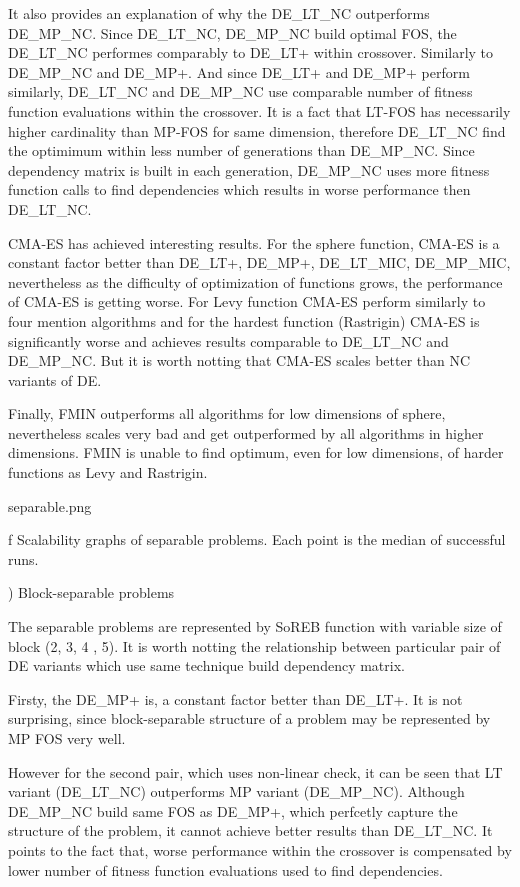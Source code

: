 It also provides an explanation of why the DE\_LT\_NC outperforms DE\_MP\_NC. Since
DE\_LT\_NC, DE\_MP\_NC build optimal FOS, the DE\_LT\_NC performes comparably to DE\_LT+
within crossover. Similarly to DE\_MP\_NC and DE\_MP+. And since DE\_LT+ and DE\_MP+
perform similarly, DE\_LT\_NC and DE\_MP\_NC use comparable number of fitness function
evaluations within the crossover. It is a fact that LT-FOS has necessarily higher
cardinality than MP-FOS for same dimension, therefore DE\_LT\_NC find the optimimum
within less number of generations than DE\_MP\_NC. Since dependency matrix is built
in each generation, DE\_MP\_NC uses more fitness function calls to find dependencies
which results in worse performance then DE\_LT\_NC.

CMA-ES has achieved interesting results. For the sphere function, CMA-ES is a constant factor
better than DE\_LT+, DE\_MP+, DE\_LT\_MIC, DE\_MP\_MIC, nevertheless as the difficulty of
optimization of functions grows, the performance of CMA-ES is getting worse. For Levy function
CMA-ES perform similarly to four mention algorithms and for the hardest function (Rastrigin)
CMA-ES is significantly worse and achieves results comparable to DE\_LT\_NC and DE\_MP\_NC.
But it is worth notting that CMA-ES scales better than NC variants of DE.

Finally, FMIN outperforms all algorithms for low dimensions of sphere, nevertheless scales
very bad and get outperformed by all algorithms in higher dimensions. FMIN is unable to find
optimum, even for low dimensions, of harder functions as Levy and Rastrigin.

\midinsert {}
\picw=14.3cm \cinspic separable.png
\caption/f Scalability graphs of separable problems. Each point is the median of
successful runs.
\endinsert

\medskip
{}) Block-separable problems
\medskip

The separable problems are represented by SoREB function with variable size of block (2, 3, 4
, 5). It is worth notting the relationship between particular pair of DE variants which use
same technique build dependency matrix.

Firsty, the DE\_MP+ is, a constant factor better than DE\_LT+. It is not surprising, since
block-separable structure of a problem may be represented by MP FOS very well.

However for the second pair, which uses non-linear check, it can be seen that LT variant
(DE\_LT\_NC) outperforms MP variant (DE\_MP\_NC). Although DE\_MP\_NC build same FOS as
DE\_MP+, which perfcetly capture the structure of the problem, it cannot achieve better
results than DE\_LT\_NC. It points to the fact that, worse performance within the crossover
is compensated by lower number of fitness function evaluations used to find dependencies.

